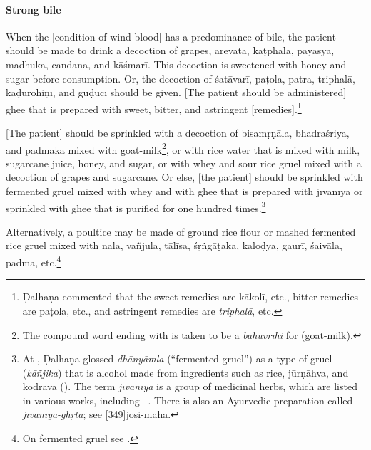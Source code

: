 \begin{translation}
\paragraph{Strong bile}    

\item[8]

When the [condition of wind-blood] has a predominance of bile, the
patient should be made to drink a decoction of grapes, \gls{ārevata},
\gls{kaṭphala}, \gls{payasyā}, \gls{madhuka}, \gls{candana}, and
\gls{kāśmarī}. This decoction is sweetened with honey and sugar before
consumption. Or, the decoction of \gls{śatāvarī}, \gls{paṭola},
\gls{patra}, \gls{triphalā}, \gls{kaḍurohiṇī}, and \gls{guḍūcī} should
be given. [The patient should be administered] ghee that is prepared
with sweet, bitter, and astringent [remedies].\footnote{Ḍalhaṇa
    commented \citep[425]{vulgate} that the sweet remedies are
    \gls{kākolī}, etc., bitter remedies are \gls{paṭola}, etc., and
    astringent remedies are \textit{triphalā}, etc.}

[The patient] should be sprinkled with a decoction of
\gls{bisamṛṇāla}, \gls{bhadraśriya}, and \gls{padmaka} mixed with
goat-milk\footnote{The compound word ending with  is
    taken to be a \textit{bahuvrīhi} for  (goat-milk).},
    or with rice water that is mixed with milk, sugarcane juice, honey,
    and sugar, or with whey and sour rice gruel mixed with a decoction of
    grapes and sugarcane. Or else, [the patient] should be sprinkled with
    fermented gruel mixed with whey and with ghee that is prepared with
    \gls{jīvanīya} or sprinkled with ghee that is purified for one
    hundred times.\footnote{At , Ḍalhaṇa glossed
        \emph{dhānyāmla} (``fermented gruel'') as a type of gruel
        (\emph{kāñjika}) that is alcohol made from ingredients such as rice,
        \gls{jūrṇāhva}, and \gls{kodrava} (). The term \emph{jīvanīya} is a
        group of medicinal herbs, which are listed in various works, including
        \CS\ . There is also an Ayurvedic preparation called
        \emph{jīvanīya-ghṛta}; see [349]{josi-maha}.\label{jīvanīya}} %

Alternatively, a poultice may
be made of ground rice flour or mashed fermented rice gruel mixed with
\gls{nala}, \gls{vañjula},
\gls{tālīsa},
\gls{śṛṅgāṭaka}, 
\gls{kaloḍya},
\gls{gaurī}, \gls{śaivāla},
\gls{padma}, etc.\footnote{On fermented  gruel see \cite[23, et passim]{mchu-2021}.

}
\end{translation}
